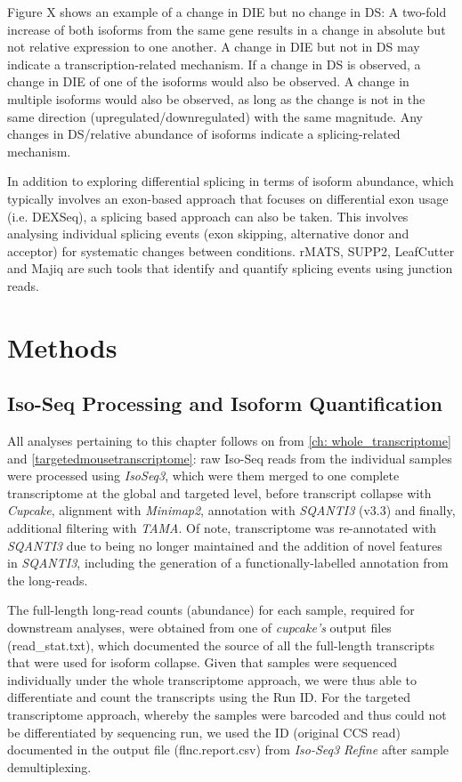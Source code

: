 Figure X shows an example of a change in DIE but no change in DS: A two-fold increase of both isoforms from the same gene results in a change in absolute but not relative expression to one another. A change in DIE but not in DS may indicate a transcription-related mechanism. If a change in DS is observed, a change in DIE of one of the isoforms would also be observed. A change in multiple isoforms would also be observed, as long as the change is not in the same direction (upregulated/downregulated) with the same magnitude. Any changes in DS/relative abundance of isoforms indicate a splicing-related mechanism. 

In addition to exploring differential splicing in terms of isoform abundance, which typically involves an exon-based approach that focuses on differential exon usage (i.e. DEXSeq), a splicing based approach can also be taken. This involves analysing individual splicing events (exon skipping, alternative donor and acceptor) for systematic changes between conditions. rMATS, SUPP2, LeafCutter and Majiq are such tools that identify and quantify splicing events using junction reads. 



\section{Methods}

\subsection{Iso-Seq Processing and Isoform Quantification}
All analyses pertaining to this chapter follows on from \cref{ch: whole_transcriptome} and \cref{targetedmousetranscriptome}: raw Iso-Seq reads from the individual samples were processed using \textit{IsoSeq3}, which were them merged to one complete transcriptome at the global and targeted level, before transcript collapse with \textit{Cupcake}, alignment with \textit{Minimap2}, annotation with \textit{SQANTI3} (v3.3) and finally, additional filtering with \textit{TAMA}. Of note, transcriptome was re-annotated with \textit{SQANTI3} due to  being no longer maintained and the addition of novel features in \textit{SQANTI3}, including the generation of a functionally-labelled annotation from the long-reads. 

The full-length long-read counts (abundance) for each sample, required for downstream analyses, were obtained from one of \textit{cupcake's} output files (read\_stat.txt), which documented the source of all the full-length transcripts that were used for isoform collapse. Given that samples were sequenced individually under the whole transcriptome approach, we were thus able to differentiate and count the transcripts using the Run ID. For the targeted transcriptome approach, whereby the samples were barcoded and thus could not be differentiated by sequencing run, we used the ID (original CCS read) documented in the output file (flnc.report.csv) from \textit{Iso-Seq3 Refine} after sample demultiplexing. 

